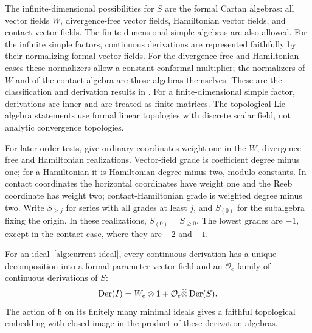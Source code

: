 The infinite-dimensional possibilities for $S$ are the formal Cartan
algebras: all vector fields $W$, divergence-free vector fields,
Hamiltonian vector fields, and contact vector fields. The
finite-dimensional simple algebras are also allowed. For the infinite
simple factors, continuous derivations are represented faithfully by
their normalizing formal vector fields. For the divergence-free and Hamiltonian cases these
normalizers allow a constant conformal multiplier; the normalizers of
$W$ and of the contact algebra are those algebras themselves. These
are the classification and derivation results in
\citet[Theorem~6.8 and Proposition~6.12(i)]{BakalovDAndreaKac2001}.
For a finite-dimensional simple factor, derivations are inner and
are treated as finite matrices.
The topological Lie algebra statements use formal linear topologies
with discrete scalar field, not analytic convergence topologies.

For later order tests, give ordinary coordinates weight one in the
$W$, divergence-free and Hamiltonian realizations. Vector-field grade
is coefficient degree minus one; for a Hamiltonian it is Hamiltonian
degree minus two, modulo constants. In contact coordinates the
horizontal coordinates have weight one and the Reeb coordinate has
weight two; contact-Hamiltonian grade is weighted degree minus two.
Write $S_{\ge j}$ for series with all grades at least $j$, and
$S_{(0)}$ for the subalgebra fixing the origin. In these realizations,
$S_{(0)}=S_{\ge0}$. The lowest grades are $-1$, except in the contact
case, where they are $-2$ and $-1$.

\begin{lemma}
\label{alg:derivation-realization}
For an ideal~\eqref{alg:current-ideal}, every continuous derivation has
a unique decomposition into a formal parameter vector field and an
$\mathcal O_e$-family of continuous derivations of $S$:
\begin{equation}
 \operatorname{Der}(I)=W_e\otimes1+
 \mathcal O_e\widehat\otimes\operatorname{Der}(S).
 \label{alg:current-derivations}
\end{equation}
The action of $\mathfrak h$ on its finitely many minimal ideals gives
a faithful topological embedding with closed image in the product of
these derivation algebras.
\end{lemma}

